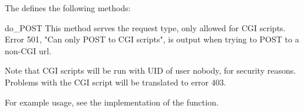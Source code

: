 The  defines the following methods:

\begin{methoddesc}{do_POST}{}
This method serves the  request type, only allowed for
CGI scripts.  Error 501, "Can only POST to CGI scripts", is output
when trying to POST to a non-CGI url.
\end{methoddesc}

Note that CGI scripts will be run with UID of user nobody, for security
reasons. Problems with the CGI script will be translated to error 403.

For example usage, see the implementation of the 
function.


\begin{seealso}
\end{seealso}
